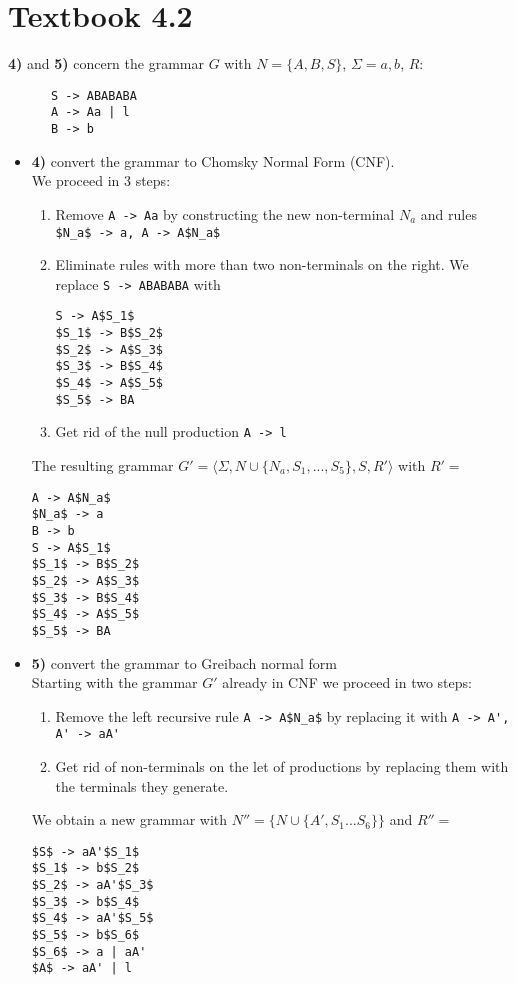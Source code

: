 \documentclass[defaultpackages]{simplereport}
\begin{document}
  \section*{Textbook 4.2}
  \textbf{4)} and \textbf{5)} concern the grammar $G$ with $N = \{A, B, S\}$,
  $\Sigma = {a, b}$, $R:$
    \begin{lstlisting}
      S -> ABABABA
      A -> Aa | l
      B -> b
      \end{lstlisting}
  \begin{itemize}[label=]
  \item \textbf{4)} convert the grammar to Chomsky Normal Form (CNF).\\
    We proceed in 3 steps:
    \begin{enumerate}
      \item Remove \lstinline{A -> Aa} by constructing the new non-terminal
        $N_a$ and rules \lstinline{$N_a$ -> a, A -> A$N_a$}
      \item Eliminate rules with more than two non-terminals on the right. We
        replace \lstinline{S -> ABABABA} with
        \begin{lstlisting}
S -> A$S_1$
$S_1$ -> B$S_2$
$S_2$ -> A$S_3$
$S_3$ -> B$S_4$
$S_4$ -> A$S_5$
$S_5$ -> BA
        \end{lstlisting}
      \item Get rid of the null production \lstinline{A -> l}
      \end{enumerate}
      The resulting grammar $G' = \langle \Sigma, N \cup \{N_a, S_{1}, ... ,
      S_5\}, S, R' \rangle$ with $R' = $
      \begin{lstlisting}
A -> A$N_a$
$N_a$ -> a
B -> b
S -> A$S_1$
$S_1$ -> B$S_2$
$S_2$ -> A$S_3$
$S_3$ -> B$S_4$
$S_4$ -> A$S_5$
$S_5$ -> BA
\end{lstlisting}

    \item \textbf{5)} convert the grammar to Greibach normal form\\
      Starting with the grammar $G'$ already in CNF we proceed in two steps:
      \begin{enumerate}
        \item Remove the left recursive rule \lstinline{A -> A$N_a$} by
          replacing it with \lstinline{A -> A', A' -> aA'}
        \item Get rid of non-terminals on the let of productions by replacing
          them with the terminals they generate.
        \end{enumerate}
     We obtain a new grammar with $N'' = \{N \cup \{A', S_1 ... S_6\}\}$ and
     $R'' =$
     \begin{lstlisting}
$S$ -> aA'$S_1$
$S_1$ -> b$S_2$
$S_2$ -> aA'$S_3$
$S_3$ -> b$S_4$
$S_4$ -> aA'$S_5$
$S_5$ -> b$S_6$
$S_6$ -> a | aA'
$A$ -> aA' | l
\end{lstlisting}


\end{itemize}
\end{document}
